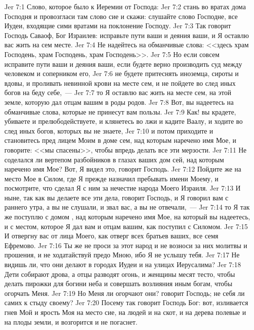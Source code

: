 \vs Jer 7:1 Слово, которое было к Иеремии от Господа:
\vs Jer 7:2 стань во вратах дома Господня и провозгласи там слово сие и скажи: слушайте слово Господне, все Иудеи, входящие сими вратами на поклонение Господу.
\vs Jer 7:3 Так говорит Господь Саваоф, Бог Израилев: исправьте пути ваши и деяния ваши, и Я оставлю вас жить на сем месте.
\vs Jer 7:4 Не надейтесь на обманчивые слова: <<здесь храм Господень, храм Господень, храм Господень>>.
\vs Jer 7:5 Но если совсем исправите пути ваши и деяния ваши, если будете верно производить суд между человеком и соперником его,
\vs Jer 7:6 не будете притеснять иноземца, сироты и вдовы, и проливать невинной крови на месте сем, и не пойдете во след иных богов на беду себе,~---
\vs Jer 7:7 то Я оставлю вас жить на месте сем, на этой земле, которую дал отцам вашим в роды родов.
\vs Jer 7:8 Вот, вы надеетесь на обманчивые слова, которые не принесут вам пользы.
\vs Jer 7:9 Как! вы крадете, убиваете и прелюбодействуете, и клянетесь во лжи и кадите Ваалу, и ходите во след иных богов, которых вы не знаете,
\vs Jer 7:10 и потом приходите и становитесь пред лицем Моим в доме сем, над которым наречено имя Мое, и говорите: <<мы спасены>>, чтобы впредь делать все эти мерзости.
\vs Jer 7:11 Не соделался ли вертепом разбойников в глазах ваших дом сей, над которым наречено имя Мое? Вот, Я видел это, говорит Господь.
\vs Jer 7:12 Пойдите же на место Мое в Силом, где Я прежде назначил пребывать имени Моему, и посмотрите, что сделал Я с ним за нечестие народа Моего Израиля.
\vs Jer 7:13 И ныне, так как вы делаете все эти дела, говорит Господь, и Я говорил вам с раннего утра, а вы не слушали, и звал вас, а вы не отвечали,~---
\vs Jer 7:14 то Я так же поступлю с домом , над которым наречено имя Мое, на который вы надеетесь, и с местом, которое Я дал вам и отцам вашим, как поступил с Силомом.
\vs Jer 7:15 И отвергну вас от лица Моего, как отверг всех братьев ваших, все семя Ефремово.
\vs Jer 7:16 Ты же не проси за этот народ и не возноси за них молитвы и прошения, и не ходатайствуй предо Мною, ибо Я не услышу тебя.
\vs Jer 7:17 Не видишь ли, что они делают в городах Иудеи и на улицах Иерусалима?
\vs Jer 7:18 Дети собирают дрова, а отцы разводят огонь, и женщины месят тесто, чтобы делать пирожки для богини неба и совершать возлияния иным богам, чтобы огорчать Меня.
\vs Jer 7:19 Но Меня ли огорчают они? говорит Господь; не себя ли самих к стыду своему?
\vs Jer 7:20 Посему так говорит Господь Бог: вот, изливается гнев Мой и ярость Моя на место сие, на людей и на скот, и на дерева полевые и на плоды земли, и возгорится и не погаснет.
